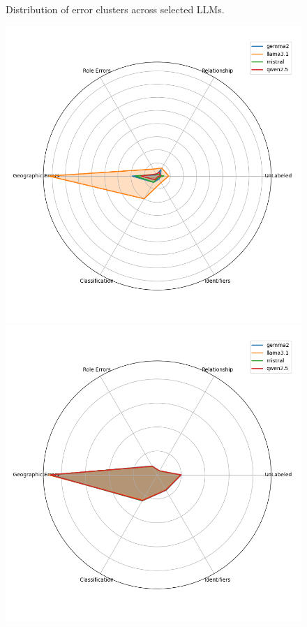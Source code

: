 \begin{figure}[ht!]
\begin{minipage}[b]{0.42\textwidth}
        \caption{Distribution of error clusters across selected LLMs.}
        \label{fig:distribution_of_error_clusters}
    \end{minipage}
\end{figure}

\begin{figure}[ht!]
    \centering
    \begin{minipage}[b]{0.42\textwidth}
        \centering
        \includegraphics[width=\textwidth]{res/radarChart-normalized-llms-1}
    \end{minipage}
    \hspace{0.05\textwidth} %
    \begin{minipage}[b]{0.42\textwidth}
        \centering
        \includegraphics[width=\textwidth]{res/radarChart-normalized-llms-4}

\end{minipage}
\end{figure}

